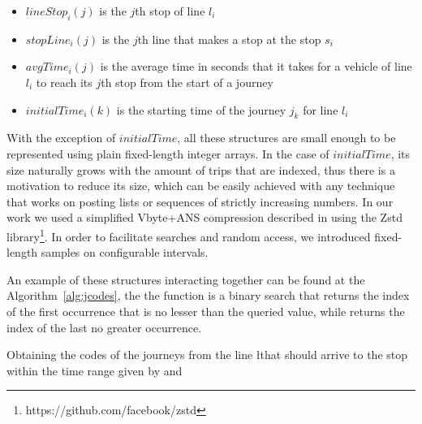 \documentclass[runningheads]{llncs}
\begin{document}
\begin{itemize}
    \item $lineStop_i(j)$ is the $j$th stop of line $l_i$
    \item $stopLine_i(j)$ is the $j$th line that makes a stop at the stop $s_i$
    \item $avgTime_i(j)$ is the average time in seconds that it takes for a vehicle of line $l_i$ to reach its $j$th stop from the start of a journey
    \item $initialTime_i(k)$ is the starting time of the journey $j_k$ for line $l_i$
\end{itemize}

With the exception of $initialTime$, all these structures are small enough to be represented using plain fixed-length integer arrays. In the case of $initialTime$, its size naturally grows with the amount of trips that are indexed, thus there is a motivation to reduce its size, which can be easily achieved with any technique that works on posting lists or sequences of strictly increasing numbers. In our work we used a simplified Vbyte+ANS compression described in \cite{moffat2017ans} using the Zstd library\footnote{https://github.com/facebook/zstd}. In order to facilitate searches and random access, we introduced fixed-length samples on configurable intervals.

An example of these structures interacting together can be found at the Algorithm~\ref{alg:jcodes}, the the function  is a binary search that returns the index of the first occurrence that is no lesser than the queried value, while  returns the index of the last no greater occurrence.

\begin{algorithm}[H]
 
 
 \caption{Obtaining the codes of the journeys from the line \l that should arrive to the stop \s within the time range given by \ta and \tz}
 \label{alg:jcodes}
\end{algorithm}
\end{document}
